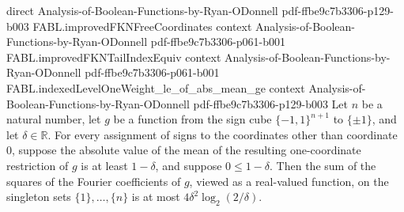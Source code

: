 \begin{theorem}
  {direct}
  {Analysis-of-Boolean-Functions-by-Ryan-ODonnell}
  {pdf-ffbe9c7b3306-p129-b003}
\proofstep
  {FABL.improvedFKNFreeCoordinates}
  {context}
  {Analysis-of-Boolean-Functions-by-Ryan-ODonnell}
  {pdf-ffbe9c7b3306-p061-b001}
\proofstep
  {FABL.improvedFKNTailIndexEquiv}
  {context}
  {Analysis-of-Boolean-Functions-by-Ryan-ODonnell}
  {pdf-ffbe9c7b3306-p061-b001}
\proofstep
  {FABL.indexedLevelOneWeight_le_of_abs_mean_ge}
  {context}
  {Analysis-of-Boolean-Functions-by-Ryan-ODonnell}
  {pdf-ffbe9c7b3306-p129-b003}
Let $n$ be a natural number, let $g$ be a function from the sign cube $\{-1,1\}^{n+1}$
to $\{\pm1\}$, and let $\delta\in\mathbb R$. For every assignment of signs to the
coordinates other than coordinate $0$, suppose the absolute value of the mean of the
resulting one-coordinate restriction of $g$ is at least $1-\delta$, and suppose $0\le
1-\delta$. Then the sum of the squares of the Fourier coefficients of $g$, viewed as a
real-valued function, on the singleton sets $\{1\},\ldots,\{n\}$ is at most
$4\delta^2\log_2(2/\delta)$.
\end{theorem}

